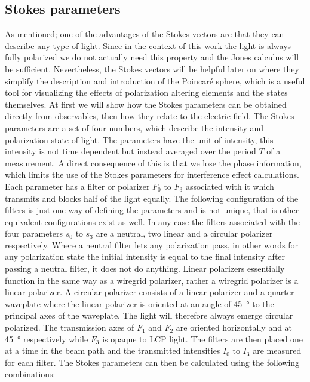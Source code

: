 \subsection{Stokes parameters}
\label{sec:stokes_parameters}
As mentioned; one of the advantages of the Stokes vectors are that they can describe any type of light. Since in the context of this work the light is always fully polarized we do not actually need this property and the Jones calculus will be sufficient. Nevertheless, the Stokes vectors will be helpful later on where they simplify the description and introduction of the Poincaré sphere, which is a useful tool for visualizing the effects of polarization altering elements and the states themselves. At first we will show how the Stokes parameters can be obtained directly from observables, then how they relate to the electric field. The Stokes parameters are a set of four numbers, which describe the intensity and polarization state of light. The parameters have the unit of intensity, this intensity is not time dependent but instead averaged over the period $T$ of a measurement. A direct consequence of this is that we lose the phase information, which limits the use of the Stokes parameters for interference effect calculations. Each parameter has a filter or polarizer $F_0$ to $F_3$ associated with it which transmits and blocks half of the light equally. The following configuration of the filters is just one way of defining the parameters and is not unique, that is other equivalent configurations exist as well. In any case the filters associated with the four parameters $s_0$ to $s_3$ are a neutral, two linear and a circular polarizer respectively. Where a neutral filter lets any polarization pass, in other words for any polarization state the initial intensity is equal to the final intensity after passing a neutral filter, it does not do anything. Linear polarizers essentially function in the same way as a wiregrid polarizer, rather a wiregrid polarizer is a linear polarizer. A circular polarizer consists of a linear polarizer and a quarter waveplate where the linear polarizer is oriented at an angle of \SI{45}{\degree} to the principal axes of the waveplate. The light will therefore always emerge circular polarized. The transmission axes of $F_1$ and $F_2$ are oriented horizontally and at \SI{45}{\degree} respectively while $F_3$ is opaque to LCP light. The filters are then placed one at a time in the beam path and the transmitted intensities $I_0$ to $I_3$ are measured for each filter. The Stokes parameters can then be calculated using the following combinations:

